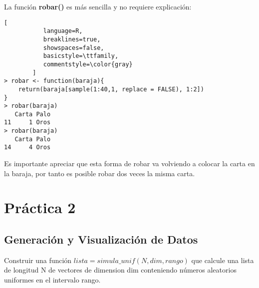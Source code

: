\documentclass[11pt,fleqn]{book} %
\begin{document}
La función \textbf{robar()} es más sencilla y no requiere explicación:
\begin{lstlisting}[
           language=R,
           breaklines=true,
           showspaces=false,
           basicstyle=\ttfamily,
           commentstyle=\color{gray}
        ]
> robar <- function(baraja){
    return(baraja[sample(1:40,1, replace = FALSE), 1:2])
}
> robar(baraja)
   Carta Palo
11     1 Oros
> robar(baraja)
   Carta Palo
14     4 Oros
\end{lstlisting}
Es importante apreciar que esta forma de robar va volviendo a colocar la carta en la baraja, por tanto es posible robar dos veces la misma carta.

\chapter{Práctica 2}
\section{Generación y Visualización de Datos}
\begin{exercise}
Construir una función $lista = simula\_unif(N,dim,rango)$ que calcule una lista de longitud N de vectores de dimension dim conteniendo números aleatorios uniformes en el intervalo rango.
\end{exercise}
\end{document}
